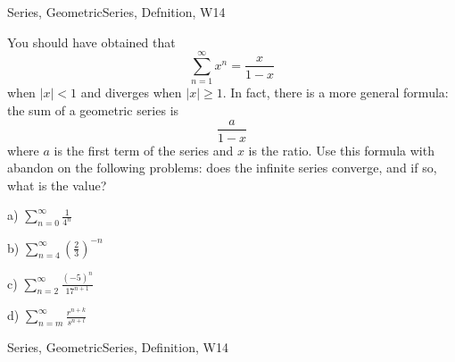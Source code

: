 \begin{tagblock}{Series, GeometricSeries, Defnition, W14}
\begin{question}

You should have obtained that
\[
\sum_{n=1}^{\infty}x^n=\frac x {1-x}
\]
when $|x|<1$ and diverges when $|x|\geq 1$. In fact, there is a more general formula: the sum of a geometric series is
\[
\frac a {1-x}
\]
where $a$ is the first term of the series and $x$ is the ratio. Use this formula with abandon on the following problems: does the infinite series converge, and if so, what is the value? 

\bigskip 

a) $\displaystyle\sum_{n=0}^{\infty}\frac 1 {4^n}$ 

\bigskip

b) $\displaystyle\sum_{n=4}^{\infty}\left(\frac 2 3\right)^{-n}$ 

\bigskip

c) $\displaystyle\sum_{n=2}^{\infty}\frac {(-5)^n}{17^{n+1}}$ 

\bigskip

d) $\displaystyle\sum_{n=m}^{\infty}\frac {r^{n+k}}{s^{n+l}}$ 
	
	
\begin{tags}
	    Series, GeometricSeries, Definition, W14
\end{tags}
	
\begin{diary}
	    
\end{diary}
	
\begin{solution}
	   
\end{solution}
	
\end{question}

\end{tagblock}

 

